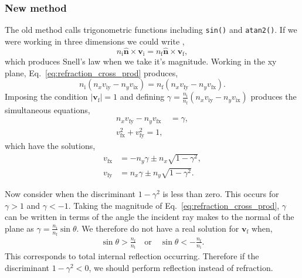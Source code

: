 \documentclass{article}
\let\vec \bm
\newcommand{\mrm}[1]{\mathrm{#1}}
\begin{document}
\subsubsection{New method}
The old method calls trigonometric functions including \texttt{sin()} and \texttt{atan2()}. If we were working in three dimensions we could write \cite{Hecht-Optics},
\begin{equation}
\label{eq:refraction_cross_prod}
    n_\mrm{i} \vec{\hat n} \times \vec{v}_\mrm{i} = n_\mrm{f} \vec{\hat n} \times \vec{v}_\mrm{f},
\end{equation}
which produces Snell's law when we take it's magnitude. Working in the xy plane, Eq.~\ref{eq:refraction_cross_prod} produces,
\begin{equation}
    n_\mrm{i} (n_x v_\mrm{iy} - n_y v_\mrm{ix})
    =
    n_\mrm{f} (n_x v_\mrm{fy} - n_y v_\mrm{fx}).
\end{equation}
Imposing the condition $|\vec{v}_\mrm{f}| = 1$ and defining $\gamma = \frac{n_\mrm{i}}{n_\mrm{f}} (n_x v_\mrm{iy} - n_y v_\mrm{ix})$ produces the simultaneous equations,
\begin{align}
    n_x v_\mrm{fy} - n_y v_\mrm{fx}
    &=
    \gamma, \\
    v_\mrm{fx}^2 + v_\mrm{fy}^2 = 1,
\end{align}
which have the solutions,
\begin{align}
\label{eq:refr_v_x}
    v_\mrm{fx} &= -n_y \gamma \pm n_x \sqrt{1-\gamma^2}, \\
\label{eq:refr_v_y}
    v_\mrm{fy} &= n_x \gamma \pm n_y \sqrt{1-\gamma^2}.
\end{align}

Now consider when the discriminant $1 - \gamma^2$ is less than zero. This occurs for $\gamma > 1$ and $\gamma < -1$. Taking the magnitude of Eq.~\ref{eq:refraction_cross_prod}, $\gamma$ can be written in terms of the angle the incident ray makes to the normal of the plane as $\gamma = \frac{n_\mrm{i}}{n_\mrm{f}} \sin \theta$. We therefore do not have a real solution for $\vec{v}_\mrm{f}$ when,
\begin{align}
    \sin \theta > \frac{n_\mrm{f}}{n_\mrm{i}} \quad \mathrm{or} \quad \sin \theta < -\frac{n_\mrm{f}}{n_\mrm{i}}.
\end{align}
This corresponds to total internal reflection occurring. Therefore if the discriminant $1 - \gamma^2 < 0$, we should perform reflection instead of refraction.
\end{document}
